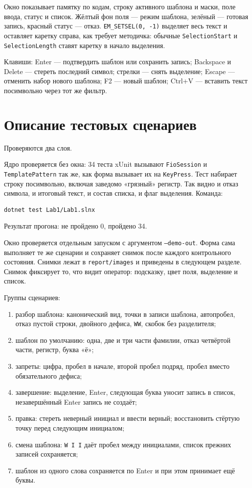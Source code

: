 \documentclass[a4paper,14pt]{extarticle}
\begin{document}
Окно показывает памятку по кодам, строку активного шаблона и маски, поле ввода, статус и список. Жёлтый фон поля --- режим шаблона, зелёный --- готовая запись, красный статус --- отказ. \texttt{EM\_SETSEL(0, -1)} выделяет весь текст и оставляет каретку справа, как требует методичка: обычные \texttt{SelectionStart} и \texttt{SelectionLength} ставят каретку в начало выделения.

Клавиши: Enter --- подтвердить шаблон или сохранить запись; Backspace и Delete --- стереть последний символ; стрелки --- снять выделение; Escape --- отменить набор нового шаблона; F2 --- новый шаблон; Ctrl+V --- вставить текст посимвольно через тот же фильтр.

\section{Описание тестовых сценариев}

Проверяются два слоя.

Ядро проверяется без окна: 34 теста xUnit вызывают \texttt{FioSession} и \texttt{TemplatePattern} так же, как форма вызывает их на \texttt{KeyPress}. Тест набирает строку посимвольно, включая заведомо «грязный» регистр. Так видно и отказ символа, и итоговый текст, и состав списка, и флаг выделения. Команда:

\begin{Verbatim}
dotnet test Lab1/Lab1.slnx
\end{Verbatim}

Результат прогона: не пройдено 0, пройдено 34.

Окно проверяется отдельным запуском с аргументом \texttt{--demo-out}. Форма сама выполняет те же сценарии и сохраняет снимок после каждого контрольного состояния. Снимки лежат в \texttt{report/images} и приведены в следующем разделе. Снимок фиксирует то, что видит оператор: подсказку, цвет поля, выделение и список.

Группы сценариев:

\begin{enumerate}
\item разбор шаблона: канонический вид, точки в записи шаблона, автопробел, отказ пустой строки, двойного дефиса, \texttt{WW}, скобок без разделителя;
\item шаблон по умолчанию: одна, две и три части фамилии, отказ четвёртой части, регистр, буква «ё»;
\item запреты: цифра, пробел в начале, второй пробел подряд, пробел вместо обязательного дефиса;
\item завершение: выделение, Enter, следующая буква уносит запись в список, незавершённый Enter запись не создаёт;
\item правка: стереть неверный инициал и ввести верный; восстановить стёртую точку перед следующим инициалом;
\item смена шаблона: \texttt{W I I} даёт пробел между инициалами, список прежних записей сохраняется;
\item шаблон из одного слова сохраняется по Enter и при этом принимает ещё буквы.
\end{enumerate}
\end{document}
